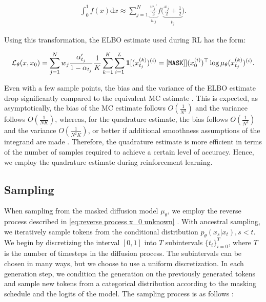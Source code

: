 \begin{align*}
    \int_{0}^{1}f(x)\mathrm{d}x \approx\sum_{j=1}^{N}\underbrace{\frac{w_j'}{2}}_{w_j} f\bigg(\underbrace{\frac{x_j}{2} + \frac{1}{2}}_{t_j}\bigg).
\end{align*}

Using this transformation, the ELBO estimate used during RL has the form:

\begin{equation*}
    \mathcal{L}_\theta(x, x_0) = \sum_{j=1}^{N}w_j\frac{\alpha_{t_j}'}{1 - \alpha_{t_j}}\frac{1}{K}\sum_{k=1}^{K}\sum_{i=1}^{L}\bold{1}[(x_{t_j}^{(k)})^{(i)} = [\mathtt{MASK}]](x_0^{(i)})^\top\log\mu_\theta(x_{t_j}^{(k)})^{(i)}.
    \label{eq:RL ELBO}
\end{equation*}

Even with a few sample points, the bias and the variance of the ELBO estimate drop significantly compared to the equivalent MC estimate \cite{rojas2025improvingreasoningdiffusionlanguage}. This is expected, as asymptotically, the bias of the MC estimate follows $O(\frac{1}{N^2})$ and the variance follows $O(\frac{1}{NK})$, whereas, for the quadrature estimate, the bias follows $O(\frac{1}{N^4})$ and the variance $O(\frac{1}{N^2K})$, or better if additional smoothness assumptions of the integrand are made \cite{rojas2025improvingreasoningdiffusionlanguage}. Therefore, the quadrature estimate is more efficient in terms of the number of samples required to achieve a certain level of accuracy. Hence, we employ the quadrature estimate during reinforcement learning.

\subsection{Sampling}
\label{sec:sampling}

When sampling from the masked diffusion model $\mu_\theta$, we employ the reverse process described in \eqref{eq:reverse process x_0 unknown} \cite{shi2025simplifiedgeneralizedmaskeddiffusion}. With ancestral sampling, we iteratively sample tokens from the conditional distribution $p_\theta(x_s | x_t), s < t $. We begin by discretizing the interval $[0, 1]$ into $T$ subintervals $\{ t_i \}_{i=0}^T$, where $T$ is the number of timesteps in the diffusion process. The subintervals can be chosen in many ways, but we choose to use a uniform discretization. In each generation step, we condition the generation on the previously generated tokens and sample new tokens from a categorical distribution according to the masking schedule and the logits of the model. The sampling process is as follows \cite{shi2025simplifiedgeneralizedmaskeddiffusion}:

